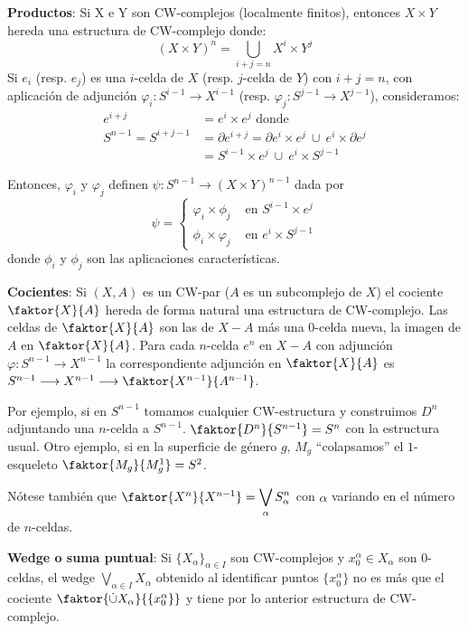 \textbf{Productos}:  Si X e Y son CW-complejos (localmente finitos), entonces $X \times Y$ hereda una estructura de CW-complejo donde:
\[ (X \times Y)^n = \bigcup_{i+j=n} X^i \times Y^j \]
Si $e_i$ (resp. $e_j$) es una $i$-celda de $X$ (resp. $j$-celda de $Y$) con $i+j=n$, con aplicación de adjunción $\varphi_i : S^{i-1} \longrightarrow X^{i-1}$ (resp. $\varphi_j : S^{j-1} \longrightarrow X^{j-1}$), consideramos:
\begin{align*} 
e^{i+j} &= e^i \times e^j \text{ donde } \\
S^{n-1} = S^{i+j-1} &= \partial e^{i+j} = \partial e^i \times e^j \ \cup \ e^i \times \partial e^j \\
&= S^{i-1} \times e^j \ \cup \ e^i \times S^{j-1}
\end{align*}

Entonces, $\varphi_i$ y $\varphi_j$ definen $\psi : S^{n-1} \longrightarrow (X \times Y)^{n-1}$ dada por 
\[ \psi = \begin{cases}
\varphi_i  \times \phi_j & \text{ en } S^{i-1} \times e^j \\
\phi_i \times \varphi_j & \text{ en } e^i \times S^{j-1}
\end{cases} \]
donde $\phi_i$ y $\phi_j$ son las aplicaciones características. \par 

\textbf{Cocientes}: Si $(X, A)$ es un CW-par ($A$ es un subcomplejo de $X$) el cociente $\faktor{X}{A}$ hereda de forma natural una estructura de CW-complejo. Las celdas de $\faktor{X}{A}$ son las de $X - A$ más una $0$-celda nueva, la imagen de $A$ en $\faktor{X}{A}$. Para cada $n$-celda $e^n$ en $X - A$ con adjunción $\varphi : S^{n-1} \longrightarrow X^{n-1}$ la correspondiente adjunción en $\faktor{X}{A}$ es $S^{n-1} \longrightarrow X^{n-1} \longrightarrow \faktor{X^{n-1}}{A^{n-1}}$. \par
Por ejemplo, si en $S^{n-1}$ tomamos cualquier CW-estructura y construimos $D^n$ adjuntando una $n$-celda a $S^{n-1}$. $\faktor{D^n}{S^{n-1}} = S^n$ con la estructura usual. Otro ejemplo, si en la superficie de género $g$, $M_g$ ``colapsamos'' el $1$-esqueleto $\faktor{M_g}{M_g^1} = S^2$. \par 
Nótese también que $\faktor{X^n}{X^{n-1}} = \displaystyle \bigvee_\alpha S_\alpha^n$ con $\alpha$ variando en el número de $n$-celdas. \par 

\textbf{Wedge o suma puntual}: Si $\{X_\alpha \}_{\alpha \in I}$ son CW-complejos y $x_0^\alpha \in X_\alpha$  son $0$-celdas, el wedge $\bigvee_{\alpha \in I} X_\alpha$ obtenido al identificar puntos $\{x_0^\alpha \}$ no es más que el cociente $\faktor{\dot{\cup} X_\alpha}{\{x_0^\alpha\}}$ y tiene por lo anterior estructura de CW-complejo. \par

